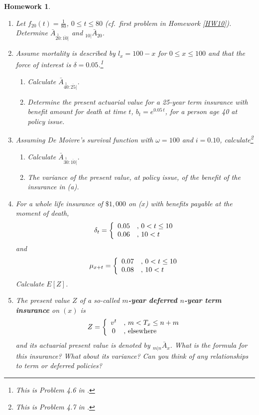 \documentclass[11pt,fleqn,oneside]{book}
\newtheorem{homework}{Homework}
\begin{document}
\begin{homework}
\label{HW11}
\begin{enumerate}
\item Let $f_{20}(t) = \frac{1}{80}$, $0\leq t \leq 80$ (cf.\ first problem in Homework \ref{HW10}). Determine $\bar{A}_{\stackrel{1}{20}:\overline{10}|}$ and  $_{10|}\bar{A}_{20}$.
\item Assume mortality is described by $l_x = 100-x$ for $0\leq x \leq 100$ and that the force of interest is $\delta =0.05$.\footnote{This is Problem 4.6 in \cite{BOWERS}.}  
\begin{enumerate}
\item Calculate $\bar{A}_{\stackrel{1}{40}:\overline{25}|}$.
\item Determine the present actuarial value for a 25-year term insurance with benefit amount for death at time $t$, $b_t = e^{0.05\,t}$, for a person age 40 at policy issue.  
\end{enumerate} 
\item Assuming De Moivre's survival function with $\omega = 100$ and $i=0.10$, calculate\footnote{This is Problem 4.7 in \cite{BOWERS}.}  
\begin{enumerate}
\item Calculate $\bar{A}_{\stackrel{1}{30}:\overline{10}|}$.
\item The variance of the present value, at policy issue, of the benefit of the insurance in (a).
\end{enumerate} 
\item For a whole life insurance of $\$1,000$ on ($x$) with benefits payable at the moment of death, 
$$
\delta_t = \left\{\begin{array}{c l}
0.05 & ,\,0<t\leq10\\
0.06 & ,\,10<t
\end{array}\right.
$$
and
$$
\mu_{x+t} = \left\{\begin{array}{c l}
0.07 & ,\,0<t\leq10\\
0.08 & ,\,10<t
\end{array}\right.
$$
Calculate $E[Z]$.
\item The present value $Z$ of a so-called \textbf{$m$-year deferred $n$-year term insurance} on $(x)$ is 
$$
Z= \left\{\begin{array}{c l}
v^t & ,\,m< T_x \leq n+m\\
0 & ,\,\text{elsewhere}
\end{array}\right.
$$
and its actuarial present value is denoted by ${_{m|n}\bar{A}_x}$. What is the formula for this insurance? What about its variance? Can you think of any relationships to term or deferred policies?

\end{enumerate}
\end{homework}
\end{document}

